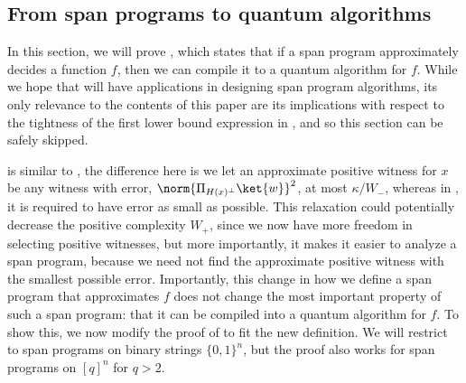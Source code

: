 \documentclass{toc}
\begin{document}
\subsection{From span programs to quantum algorithms}\label{sec:span-to-alg}

In this section, we will prove , which states that if a span program approximately decides a function $f$, then we can compile it to a quantum algorithm for $f$.
While we hope that  will have applications in designing span program algorithms, its only relevance to the contents of this paper are its implications with respect to the tightness of the first lower bound expression in , and so this section can be safely skipped. 

 is similar to \cite[Lemma 3.6]{IJ15}, the difference here is we let an approximate positive witness for $x$ be any witness with error, $\norm{\Pi_{H(x)^\bot}\ket{w}}^2$, at most $\kappa/W_-$, whereas in \cite{IJ15}, it is required to have error as small as possible. This relaxation could potentially decrease the positive complexity $\widehat{W}_+$, since we now have more freedom in selecting positive witnesses, but more importantly, it makes it easier to analyze a span program, because we %
need not  %
find the approximate positive witness with the smallest possible error. Importantly, this change in how we define a span program that approximates $f$ does not change the most important property of such a span program: that it can be compiled into a quantum algorithm for $f$. To show this, we now modify the proof of \cite[Lemma 3.6]{IJ15} to fit the new definition. We will restrict to span programs on binary strings $\{0,1\}^n$, but the proof also works for span programs on $[q]^n$ for $q>2$. 
\end{document}
